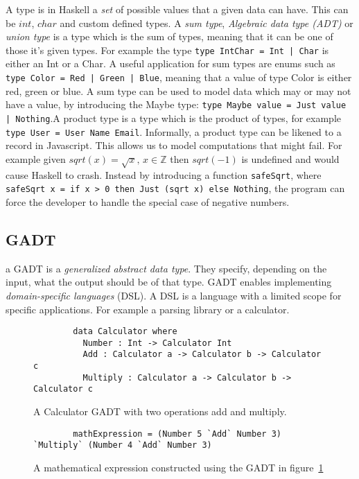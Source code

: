 A type is in Haskell a \textit{set} of possible values that a given data can
have. This can be $int$, $char$ and custom defined types. A \textit{sum type},
\textit{Algebraic data type (ADT)} or \textit{union type} is a type which is the
sum of types, meaning that it can be one of those it's given types. For example
the type \texttt{type IntChar = Int | Char} is either an Int or a Char. A useful
application for sum types are enums such as \texttt{type Color = Red | Green |
Blue}, meaning that a value of type Color is either red, green or blue. A sum
type can be used to model data which may or may not have a value, by introducing
the Maybe type: \texttt{type Maybe value = Just value | Nothing}.A product type
is a type which is the product of types, for example \texttt{type User = User
Name Email}.  Informally, a product type can be likened to a record in
Javascript.  This allows us to model computations that might fail. For example
given $sqrt(x) = \sqrt{x},\, x\in \mathbb{Z}$ then $sqrt(-1)$ is undefined and
would cause Haskell to crash.  Instead by introducing a function
\texttt{safeSqrt}, where \texttt{safeSqrt x = if x > 0 then Just (sqrt x) else
Nothing}, the program can force the developer to handle the special case of
negative numbers. 

\subsection{GADT}\label{gadt}

a GADT is a \textit{generalized abstract data type}.  They specify, depending on
the input, what the output should be of that type. GADT enables implementing
\textit{domain-specific languages} (DSL). A DSL is a language with a limited
scope for specific applications. For example a parsing library or a calculator.

\begin{figure}[H]
    \begin{lstlisting}
        data Calculator where 
          Number : Int -> Calculator Int
          Add : Calculator a -> Calculator b -> Calculator c
          Multiply : Calculator a -> Calculator b -> Calculator c
    \end{lstlisting}
    \caption{A Calculator GADT with two operations add and multiply.}
    \label{gadtcalculator}
\end{figure}

\begin{figure}[H]
    \begin{lstlisting}
        mathExpression = (Number 5 `Add` Number 3) `Multiply` (Number 4 `Add` Number 3)
    \end{lstlisting}
    \caption{A mathematical expression constructed using the GADT in
    figure~\ref{gadtcalculator}}
    \label{mathexpressiongadt}
\end{figure}


